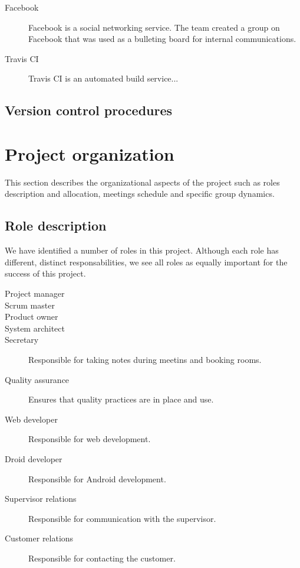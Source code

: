 \begin{description}
\item[Facebook]
Facebook is a social networking service. The team created a group on Facebook that was used as a bulleting board for internal communications.

\item[Travis CI]
Travis CI is an automated build service...


\end{description}


\subsection{Version control procedures}



\section{Project organization}
\label{section:organization}

This section describes the organizational aspects of the project such as roles description and allocation, meetings schedule and
specific group dynamics.

\subsection{Role description}
We have identified a number of roles in this project. Although each role has different, distinct responsabilities, we see all roles as equally important for the success of this project.

\begin{description}
\item[Project manager]
\item[Scrum master]
\item[Product owner]
\item[System architect]
\item[Secretary]
Responsible for taking notes during meetins and booking rooms.
\item[Quality assurance]
Ensures that quality practices are in place and use.
\item[Web developer]
Responsible for web development.
\item[Droid developer]
Responsible for Android development.
\item[Supervisor relations]
Responsible for communication with the supervisor.
\item[Customer relations]
Responsible for contacting the customer.
\end{description}

